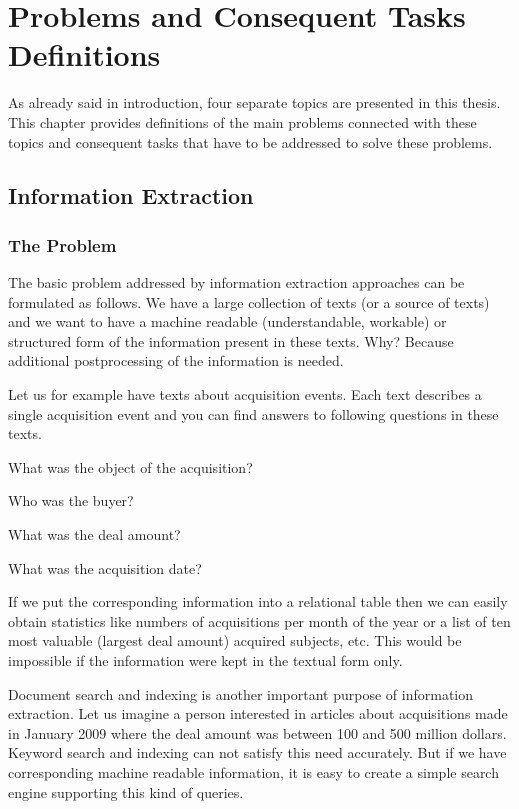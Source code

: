 \chapter{Problems and Consequent Tasks Definitions} \label{sec:ch_problems}

As already said in introduction, four separate topics are presented in this thesis. This chapter provides definitions of the main problems connected with these topics and consequent tasks that have to be addressed to solve these problems.

\section{Information Extraction}

\subsection{The Problem}

The basic problem addressed by information extraction approaches can be formulated as follows. We have a large collection of texts (or a source of texts) and we want to have a machine readable (understandable, workable) or structured form of the information present in these texts. Why? Because additional postprocessing of the information is needed.

Let us for example have texts about acquisition events. Each text describes a single acquisition event and you can find answers to following questions in these texts. 

What was the object of the acquisition? 

Who was the buyer? 

What was the deal amount?

What was the acquisition date?

If we put the corresponding information into a relational table then we can easily obtain statistics like numbers of acquisitions per month of the year or a list of ten most valuable (largest deal amount) acquired subjects, etc. This would be impossible if the information were kept in the textual form only.

Document search and indexing is another important purpose of information extraction. Let us imagine a person interested in articles about acquisitions made in January 2009 where the deal amount was between 100 and 500 million dollars.  Keyword search and indexing can not satisfy this need accurately. But if we have corresponding machine readable information, it is easy to create a simple search engine supporting this kind of queries.

